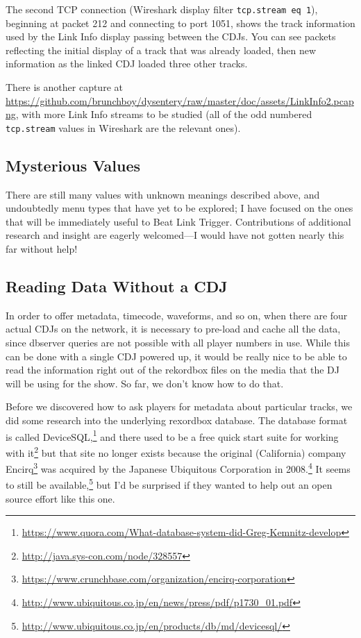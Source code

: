 \documentclass[11pt]{article}
\begin{document}
The second TCP connection (Wireshark display filter {\tt tcp.stream eq
  1}), beginning at packet 212 and connecting to port 1051, shows the
track information used by the Link Info display passing between the
CDJs. You can see packets reflecting the initial display of a track
that was already loaded, then new information as the linked CDJ loaded
three other tracks.

There is another capture at
\url{https://github.com/brunchboy/dysentery/raw/master/doc/assets/LinkInfo2.pcapng},
with more Link Info streams to be studied (all of the odd numbered
{\tt tcp.stream} values in Wireshark are the relevant ones).

\subsection{Mysterious Values}

There are still many values with unknown meanings described above, and
undoubtedly menu types that have yet to be explored; I have focused on
the ones that will be immediately useful to Beat Link Trigger.
Contributions of additional research and insight are eagerly
welcomed---I would have not gotten nearly this far without help!

\subsection{Reading Data Without a CDJ}

In order to offer metadata, timecode, waveforms, and so on, when there
are four actual CDJs on the network, it is necessary to pre-load and
cache all the data, since dbserver queries are not possible with all
player numbers in use. While this can be done with a single CDJ
powered up, it would be really nice to be able to read the information
right out of the rekordbox files on the media that the DJ will be
using for the show. So far, we don't know how to do that.

Before we discovered how to ask players for metadata about
particular tracks, we did some research into the underlying rexordbox
database. The database format is called
DeviceSQL,\footnote{\url{https://www.quora.com/What-database-system-did-Greg-Kemnitz-develop}}
and there used to be a free quick start suite for working with
it\footnote{\url{http://java.sys-con.com/node/328557}} but that site
no longer exists because the original (California) company
Encirq\footnote{\url{https://www.crunchbase.com/organization/encirq-corporation}}
was acquired by the Japanese Ubiquitous Corporation in
2008.\footnote{\url{http://www.ubiquitous.co.jp/en/news/press/pdf/p1730_01.pdf}}
It seems to still be
available,\footnote{\url{http://www.ubiquitous.co.jp/en/products/db/md/devicesql/}}
but I'd be surprised if they wanted to help out an open source effort
like this one.
\end{document}

